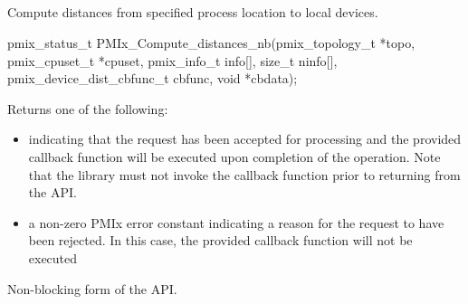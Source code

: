 \subsection{}

\summary

Compute distances from specified process location to local devices.

\format

\cspecificstart
\begin{codepar}
pmix_status_t
PMIx_Compute_distances_nb(pmix_topology_t *topo,
                          pmix_cpuset_t *cpuset,
                          pmix_info_t info[], size_t ninfo[],
                          pmix_device_dist_cbfunc_t cbfunc,
                          void *cbdata);
\end{codepar}
\cspecificend

\begin{arglist}
\end{arglist}

Returns one of the following:

\begin{itemize}
\item {} indicating that the request has been accepted for processing and the provided callback function will be executed upon completion of the operation. Note that the library must not invoke the callback function prior to returning from the \ac{API}.
\item a non-zero \ac{PMIx} error constant indicating a reason for the request to have been rejected. In this case, the provided callback function will not be executed
\end{itemize}


\descr

Non-blocking form of the  \ac{API}.

